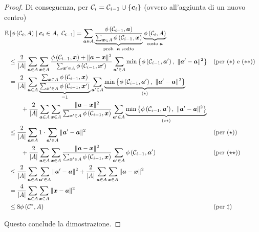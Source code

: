 \begin{proof}
    Di conseguenza, per $\mathcal{C}_i = \mathcal{C}_{i-1} \cup \left\{\bm c_i \right\}$ (ovvero all'aggiunta di un nuovo centro)
    \begin{align*}
        \Ex & \left[\phi \left(\C_i, A\right) \mid \bm c_i \in A, \ \C_{i-1} \right] = \sum_{\bm a \in A} \underbrace{\frac{\phi \left(\C_{i-1}, \bm a\right)}{\sum_{\bm x \in A} \phi \left(\C_{i-1}, \bm x\right)}}_{\text{prob. } \bm a \text{ scelto}} \underbrace{\phi \left(\C_i, A\right)}_{\text{costo } \bm a}\\
        & \leq \frac{2}{|A|} \sum_{\bm a \in A} \sum_{\bm x \in A} \frac{\phi \left(\C_{i-1}, \bm x\right) + \| \bm a - \bm x \|^2}{\sum_{\bm x' \in A} \phi \left(\C_{i-1}, \bm x'\right)} \sum_{\bm a' \in A} \min \left\{\phi \left(\C_{i-1}, \bm a'\right), \ \| \bm a' - \bm a \|^2 \right\} && (\text{per } (\ast) \text{ e } (\ast \ast)) \\
        & = \frac{2}{|A|} \sum_{\bm a \in A} \underbrace{\frac{\sum_{\bm x \in A} \phi \left(\C_{i-1}, \bm x\right)}{\sum_{\bm x' \in A} \phi \left(\C_{i-1}, \bm x'\right)}}_{ = 1 } \sum_{\bm a' \in A} \underbrace{\min \left\{\phi \left(\C_{i-1}, \bm a' \right), \ \| \bm a' - \bm a \|^2 \right\}}_{(\star)} \\
        & \qquad + \frac{2}{|A|} \sum_{\bm a \in A} \sum_{\bm x \in A} \frac{\| \bm a - \bm x \|^2}{\sum_{\bm x' \in A} \phi \left(\C_{i-1}, \bm x \right)} \sum_{\bm a' \in A} \underbrace{\min \left\{\phi \left(\C_{i-1}, \bm a'\right), \ \| \bm a' - \bm a \|^2 \right\}}_{(\star \star)} \\
         & \leq \frac{2}{|A|} \sum_{\bm a \in A} 1 \cdot \sum_{\bm a' \in A} \| \bm a' - \bm a \|^2 && (\text{per } (\star)) \\
        & \qquad + \frac{2}{|A|} \sum_{\bm a \in A} \sum_{\bm x \in A} \frac{\| \bm a - \bm x \|^2}{\sum_{\bm x' \in A} \phi \left(\C_{i-1}, \bm x \right)} \sum_{\bm a' \in A} \phi \left(\C_{i-1}, \bm a'\right) && (\text{per } (\star \star)) \\
        & \leq \frac{2}{|A|} \sum_{\bm a \in A} \sum_{\bm a' \in A} \| \bm a' - \bm a \|^2 + \frac{2}{|A|} \sum_{\bm a \in A} \sum_{\bm x \in A} \| \bm a - \bm x \|^2 \\
        & = \frac{4}{|A|} \sum_{\bm a \in A} \sum_{\bm x \in A} \| \bm x - \bm a \|^2 \\
        & \leq 8 \phi \left(\C^\ast, A\right) && (\text{per } \ddag)
    \end{align*}

    Questo conclude la dimostrazione.
\end{proof}

